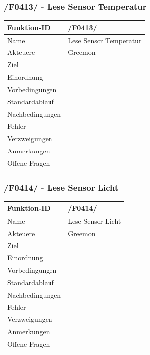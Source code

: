 \documentclass[pointlessnumbers]{scrartcl}
\begin{document}
 \subsubsection{/F0413/ - Lese Sensor Temperatur}
 \begin{tabular}{|p{\BreiteErsterTab}|p{\BreiteZweiterTab}|}\hline
    Funktion-ID &       /F0413/  
                        \\ \hline
    Name &              Lese Sensor Temperatur
                        \\ \hline
    Akteuere &          Greemon
                        \\ \hline
    Ziel &             
                        \\ \hline
    Einordnung &        
                        \\ \hline
    Vorbedingungen &    
                        \\ \hline
    Standardablauf &    
                        \\ \hline
    Nachbedingungen &   
                        \\ \hline
    Fehler &       
                        \\ \hline
    Verzweigungen &     
                        \\ \hline
    Anmerkungen &       
                        \\ \hline
    Offene Fragen &     
                        \\ \hline
 \end{tabular} 
 
 \subsubsection{/F0414/ - Lese Sensor Licht}
 \begin{tabular}{|p{\BreiteErsterTab}|p{\BreiteZweiterTab}|}\hline
    Funktion-ID &       /F0414/  
                        \\ \hline
    Name &              Lese Sensor Licht
                        \\ \hline
    Akteuere &          Greemon
                        \\ \hline
    Ziel &             
                        \\ \hline
    Einordnung &        
                        \\ \hline
    Vorbedingungen &    
                        \\ \hline
    Standardablauf &    
                        \\ \hline
    Nachbedingungen &   
                        \\ \hline
    Fehler &       
                        \\ \hline
    Verzweigungen &     
                        \\ \hline
    Anmerkungen &       
                        \\ \hline
    Offene Fragen &     
                        \\ \hline
 \end{tabular} 
 
\end{document}
